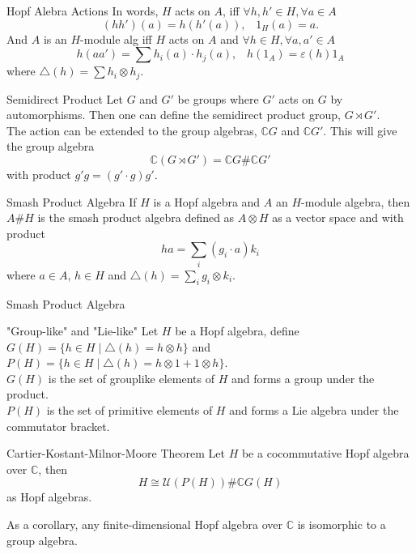 \documentclass{beamer}
\begin{document}
\begin{frame}{Hopf Alebra Actions}
In words, $H$ acts on $A$, iff $\forall h,h'\in H,\forall a\in A$
\[
(hh')(a)=h(h'(a)),\;\;\; 1_H(a)=a. 
\]
And $A$ is an $H$-module alg iff $H$ acts on $A$ and $\forall h\in H,\forall a,a'\in A$
\[
h(aa')=\sum h_i(a)\cdot h_j(a),\;\;\; h(1_A)=\varepsilon(h)1_A    
\]
where $\triangle(h)=\sum h_i\otimes h_j$.

\end{frame}

\begin{frame}{Semidirect Product}
    Let $G$ and $G'$ be groups where $G'$ acts on $G$ by automorphisms. 
    Then one can define the semidirect product group, $G\rtimes G'$.\\
    The action can be extended to the group algebras, $\mathbb{C}G$ and $\mathbb{C}G'$.
    This will give the group algebra 
    \[
    \mathbb{C}(G\rtimes G')=\mathbb{C}G\#\mathbb{C}G'    
    \]
    with product $g'g=(g'\cdot g)g'$.\\
    \begin{block}{Smash Product Algebra}
        If $H$ is a Hopf algebra and $A$ an $H$-module algebra, then $A\#H$ is the smash product algebra defined as $A\otimes H$ as a vector space and with product
        \[
        ha=\sum_{i} (g_i\cdot a)k_i 
        \]
        where $a\in A$, $h\in H$ and $\triangle(h)=\sum_i g_i\otimes k_i$.
    \end{block}
\end{frame}

\begin{frame}{Smash Product Algebra}
    \begin{block}{"Group-like" and "Lie-like"}
        Let $H$ be a Hopf algebra, define $G(H)=\{h\in H\;\vert\; \triangle(h)=h\otimes h\}$ and $P(H)=\{h\in H\;\vert\; \triangle(h)=h\otimes 1+1\otimes h\}$.\\
        $G(H)$ is the set of grouplike elements of $H$ and forms a group under the product.\\
        $P(H)$ is the set of primitive elements of $H$ and forms a Lie algebra under the commutator bracket.
    \end{block}
    \begin{block}{Cartier-Kostant-Milnor-Moore Theorem}
        Let $H$ be a cocommutative Hopf algebra over $\mathbb{C}$, then 
        \[
            H\cong \mathcal{U}(P(H))\# \mathbb{C}G(H)
        \]
        as Hopf algebras.
    \end{block}
    As a corollary, any finite-dimensional Hopf algebra over $\mathbb{C}$ is isomorphic to a group algebra.
\end{frame}
\end{document}
